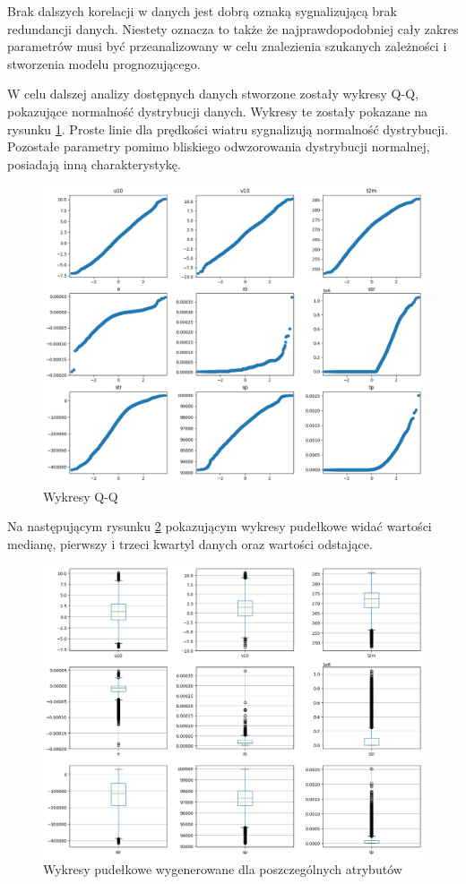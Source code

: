 Brak dalszych korelacji w danych jest dobrą oznaką sygnalizującą brak redundancji danych.
Niestety oznacza to także że najprawdopodobniej cały zakres parametrów musi być przeanalizowany
w celu znalezienia szukanych zależności i stworzenia modelu prognozującego. 

W celu dalszej analizy dostępnych danych stworzone zostały wykresy Q-Q, pokazujące normalność
dystrybucji danych. Wykresy te zostały pokazane na rysunku \ref{qq}. Proste linie dla prędkości 
wiatru sygnalizują normalność dystrybucji. Pozostałe parametry pomimo bliskiego odwzorowania
dystrybucji normalnej, posiadają inną charakterystykę. 


\begin{figure}[H]
    \centering
    \includegraphics[width=\textwidth]{images/qq.png}
    \caption{Wykresy Q-Q}
    \label{qq}
\end{figure}

Na następującym rysunku \ref{box} pokazującym wykresy pudełkowe widać wartości medianę, pierwszy i trzeci
kwartyl danych oraz wartości odstające. 

\begin{figure}[H]
    \centering
    \includegraphics[width=\textwidth]{images/box.png}
    \caption{Wykresy pudełkowe wygenerowane dla poszczególnych atrybutów}
    \label{box}
\end{figure}

